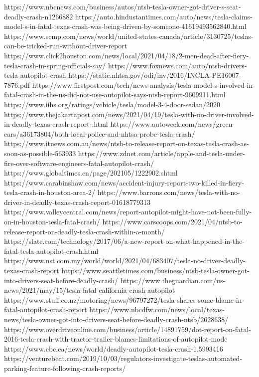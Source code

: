 https://www.nbcnews.com/business/autos/ntsb-tesla-owner-got-driver-s-seat-deadly-crash-n1266882
https://auto.hindustantimes.com/auto/news/tesla-claims-model-s-in-fatal-texas-crash-was-being-driven-by-someone-41619493562840.html
https://www.scmp.com/news/world/united-states-canada/article/3130725/teslas-can-be-tricked-run-without-driver-report
https://www.click2houston.com/news/local/2021/04/18/2-men-dead-after-fiery-tesla-crash-in-spring-officials-say/
https://www.foxnews.com/auto/ntsb-drivers-tesla-autopilot-crash
https://static.nhtsa.gov/odi/inv/2016/INCLA-PE16007-7876.pdf
https://www.firstpost.com/tech/news-analysis/tesla-model-s-involved-in-fatal-crash-in-the-us-did-not-use-autopilot-says-ntsb-report-9609911.html
https://www.iihs.org/ratings/vehicle/tesla/model-3-4-door-sedan/2020
https://www.thejakartapost.com/news/2021/04/19/tesla-with-no-driver-involved-in-deadly-texas-crash-report-.html
https://www.autoweek.com/news/green-cars/a36173804/both-local-police-and-nhtsa-probe-tesla-crash/
https://www.itnews.com.au/news/ntsb-to-release-report-on-texas-tesla-crash-as-soon-as-possible-563933
https://www.zdnet.com/article/apple-and-tesla-under-fire-over-software-engineers-fatal-autopilot-crash/
https://www.globaltimes.cn/page/202105/1222902.shtml
https://www.carabinshaw.com/news/accident-injury-report-two-killed-in-fiery-tesla-crash-in-houston-area-2/
https://www.barrons.com/news/tesla-with-no-driver-in-deadly-texas-crash-report-01618779313
https://www.valleycentral.com/news/report-autopilot-might-have-not-been-fully-on-in-houston-tesla-fatal-crash/
https://www.carscoops.com/2021/04/ntsb-to-release-report-on-deadly-tesla-crash-within-a-month/
https://slate.com/technology/2017/06/a-new-report-on-what-happened-in-the-fatal-tesla-autopilot-crash.html
https://www.nst.com.my/world/world/2021/04/683407/tesla-no-driver-deadly-texas-crash-report
https://www.seattletimes.com/business/ntsb-tesla-owner-got-into-drivers-seat-before-deadly-crash/
https://www.theguardian.com/us-news/2021/may/15/tesla-fatal-california-crash-autopilot
https://www.stuff.co.nz/motoring/news/96797272/tesla-shares-some-blame-in-fatal-autopilot-crash-report
https://www.nbcdfw.com/news/local/texas-news/tesla-owner-got-into-drivers-seat-before-deadly-crash-ntsb/2628638/
https://www.overdriveonline.com/business/article/14891759/dot-report-on-fatal-2016-tesla-crash-with-tractor-trailer-blames-limitations-of-autopilot-mode
https://www.cbc.ca/news/world/deadly-autopilot-tesla-crash-1.5993416
https://venturebeat.com/2019/10/03/regulators-investigate-teslas-automated-parking-feature-following-crash-reports/
